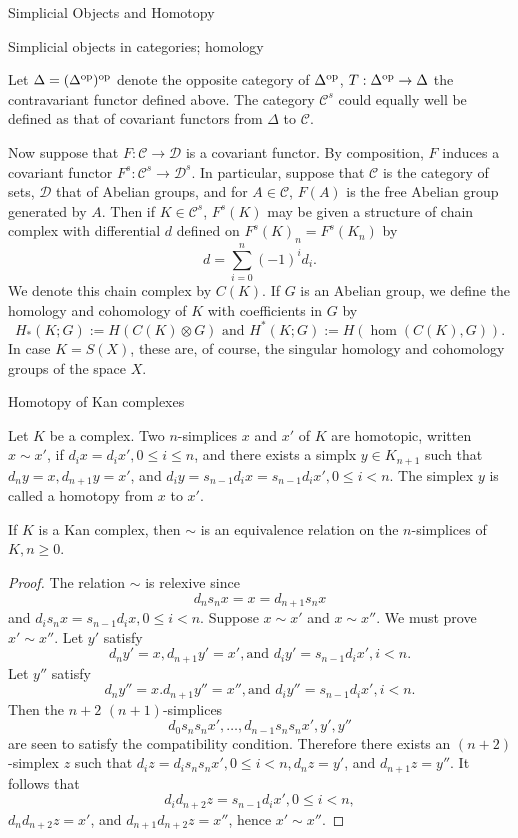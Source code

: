 \documentclass[a4,20pt,twosides]{book}
\begin{document}
\begin{chapter}{Simplicial Objects and Homotopy}
\begin{section}{Simplicial objects in categories; homology}
	\begin{rem}
		Let $\Delta= (\Delta^{\text{op}})^{\text{op}}$ denote the opposite category of $\Delta^{\text{op}}$, $T: \Delta^{\text{op}} \rightarrow \Delta$ the contravariant functor defined above. The category $\mathcal{C}^s$ could equally well be defined as that of covariant functors from $\Delta$ to $\mathcal{C}$.
	\end{rem}
	Now suppose that $F: \mathcal{C} \rightarrow \mathcal{D}$ is a covariant functor. By composition, $F$ induces a covariant functor $F^s : \mathcal{C}^s \rightarrow \mathcal{D}^s$. In particular, suppose that $\mathcal{C}$ is the category of sets, $\mathcal{D}$ that of Abelian groups, and for $A \in \mathcal{C}$, $F(A)$ is the free Abelian group generated by $A$. Then if $K \in \mathcal{C}^s$, $F^s (K)$ may be given a structure of chain complex with differential $d$ defined on $F^s (K)_n = F^s (K_n)$ by 
	\[
	d = \sum_{i=0}^{n}(-1)^i d_i.
	\]
	We denote this chain complex by $C(K)$. If $G$ is an Abelian group, we define the homology and cohomology of $K$ with coefficients in $G$ by
	\[
	H_{*}(K;G):= H(C(K) \otimes G) \text{ and } H^{*}(K;G):=H(\hom(C(K),G)).
	\]
	In case $K= S(X)$, these are, of course, the singular homology and cohomology groups of the space $X$.
\end{section}

\begin{section}{Homotopy of Kan complexes}
\begin{chdefn}
	Let $K$ be a complex. Two $n$-simplices $x$ and $x'$ of $K$ are homotopic, written $x \sim x'$, if $d_i x =d_i x', 0 \leq i \leq n$, and there exists a simplx $y \in K_{n+1}$ such that $d_n y =x, d_{n+1} y =x'$, and $d_i y =s_{n-1}d_i x = s_{n-1} d_i x', 0\leq i <n$. The simplex $y$ is called a homotopy from $x$ to $x'$.
\end{chdefn}

\begin{chprop}
	\label{prop2}
	If $K$ is a Kan complex, then $\sim$ is an equivalence relation on the $n$-simplices of $K, n \geq 0$.
\end{chprop}
\begin{proof}
	The relation $\sim$ is relexive since 
	\[
	d_n s_n x = x = d_{n+1} s_n x
	\]
	and $d_i s_n x = s_{n-1} d_i x, 0 \leq i < n$. Suppose $x \sim x'$ and $x \sim x''$. We must prove $x' \sim x''$. Let $y'$ satisfy
	\[
	d_n y' =x, d_{n+1} y' = x', \text{and } d_i y' =s_{n-1} d_i x', i<n.
	\]
	Let $y''$ satisfy
	\[
	d_n y'' =x. d_{n+1} y'' = x'', \text{and } d_i y'' = s_{n-1} d_i x', i<n.
	\]
	Then the $n+2$ $(n+1)$-simplices
	\[
	d_0 s_n s_n x', \dots ,d_{n-1} s_n s_n x', y', y''
	\]
	are seen to satisfy the compatibility condition. Therefore there exists an $(n+2)$-simplex $z$ such that $d_i z = d_i s_n s_n x', 0\leq i <n, d_n z = y'$, and $d_{n+1} z = y''$. It follows that 
	\[
	d_i d_{n+2} z = s_{n-1} d_i x', 0 \leq i < n,
	\]
	$d_n d_{n+2} z = x'$, and $d_{n+1} d_{n+2} z = x''$, hence $x' \sim x''$.
\end{proof}


\end{section}
\end{chapter}
\end{document}

